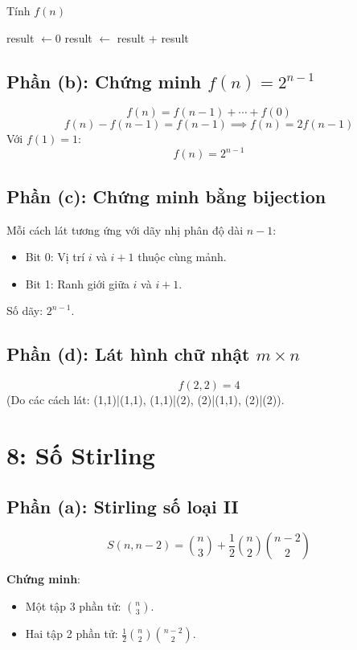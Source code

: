 \documentclass[a4paper,12pt]{article}
\theoremstyle{plain}
\theoremstyle{definition}
\begin{document}
\begin{algorithm}
\caption{Tính \( f(n) \)}
\begin{algorithmic}
     
    \EndIf
    \State result $\gets 0$
        \State result $\gets$ result + 
    \EndFor
    \State \Return result
\EndFunction
\end{algorithmic}
\end{algorithm}

\subsection*{Phần (b): Chứng minh \( f(n) = 2^{n-1} \)}
\[
f(n) = f(n-1) + \cdots + f(0)
\]
\[
f(n) - f(n-1) = f(n-1) \implies f(n) = 2f(n-1)
\]
Với \( f(1) = 1 \):
\[
f(n) = 2^{n-1}
\]

\subsection*{Phần (c): Chứng minh bằng bijection}
Mỗi cách lát tương ứng với dãy nhị phân độ dài \( n-1 \):
\begin{itemize}
    \item Bit 0: Vị trí \( i \) và \( i+1 \) thuộc cùng mảnh.
    \item Bit 1: Ranh giới giữa \( i \) và \( i+1 \).
\end{itemize}
Số dãy: \( 2^{n-1} \).

\subsection*{Phần (d): Lát hình chữ nhật \( m \times n \)}
\[
f(2,2) = 4
\]
(Do các cách lát: (1,1)|(1,1), (1,1)|(2), (2)|(1,1), (2)|(2)).


\section*{8: Số Stirling}

\subsection*{Phần (a): Stirling số loại II}
\[
S(n,n-2) = \binom{n}{3} + \frac{1}{2}\binom{n}{2}\binom{n-2}{2}
\]

\textbf{Chứng minh}:
\begin{itemize}
    \item Một tập 3 phần tử: \( \binom{n}{3} \).
    \item Hai tập 2 phần tử: \( \frac{1}{2}\binom{n}{2}\binom{n-2}{2} \).
\end{itemize}
\end{document}
